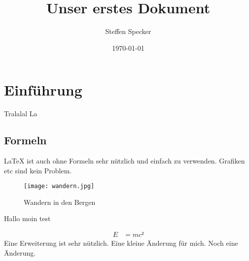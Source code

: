 \documentclass[12pt,a4paper]{article}
\author{Steffen Specker}
\title{Unser erstes Dokument}
\date{\today}
\begin{document}
\maketitle
\tableofcontents

\newpage

\section{Einführung}

Tralalal La



\subsection{Formeln}

\LaTeX{} ist auch ohne Formeln sehr nützlich und einfach zu verwenden. Grafiken etc sind kein Problem.


\begin{figure}[h]
\begin{center}
\texttt{[image: wandern.jpg]}
\caption{Wandern in den Bergen}
\label{wandern.pgtest}

\end{center}
\end{figure}

Hallo moin test

\begin{align*}
E &= mc²
\end{align*}
Eine Erweiterung ist sehr nützlich.
Eine kleine Änderung für mich.
Noch eine Änderung.
\end{document}

